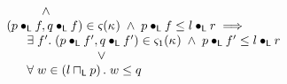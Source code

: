 \begin{definition}
\[\begin{array}{l}
\begin{array}{l}
		\hspace*{1cm} \land\\
		
		(p \composeL f, q \composeL f) \in \amod{}(\ca{})
		\;\land\; p \composeL f \leq l \composeL r \implies \\
		\hspace*{0.4cm}
		\begin{array}{l}
			\exsts{f'} (p \composeL f', q \composeL f') \in \amod{1}(\ca{}) \;\land\; p \composeL f' \leq l \composeL r \\
			\hspace*{2cm} \lor\\
			\for{w \in \left( l \meetL p \right)} w \leq q
		\end{array}

	\end{array}\\\\
	
%		
	
\end{array}
\]
%
\end{definition}
%
%
